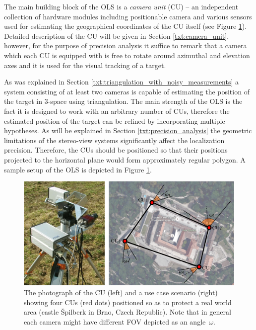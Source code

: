 The main building block of the OLS is a \textit{camera unit} (CU) -- an independent collection of hardware modules including positionable camera and various sensors used for estimating the geographical coordinates of the CU itself (see Figure \ref{fig:cu_and_topology}). Detailed description of the CU will be given in Section \ref{txt:camera_unit}, however, for the purpose of precision analysis it suffice to remark that a camera which each CU is equipped with is free to rotate around azimuthal and elevation axes and it is used for the visual tracking of a target.

As was explained in Section \ref{txt:triangulation_with_noisy_measurements} a system consisting of at least two cameras is capable of estimating the position of the target in 3-space using triangulation. The main strength of the OLS is the fact it is designed to work with an arbitrary number of CUs, therefore the estimated position of the target can be refined by incorporating multiple hypotheses. As will be explained in Section \ref{txt:precision_analysis} the geometric limitations of the stereo-view systems significantly affect the localization precision. Therefore, the CUs should be positioned so that their positions projected to the horizontal plane would form approximately regular polygon. A sample setup of the OLS is depicted in Figure \ref{fig:cu_and_topology}.

\begin{figure}[htb]\centering
	\centering
	\includegraphics[width=0.75\linewidth]{fig/cu_and_spilberk_camera_units.pdf}
	\caption{The photograph of the CU (left) and a use case scenario (right) showing four CUs (red dots) positioned so as to protect a real world area (castle Špilberk in Brno, Czech Republic). Note that in general each camera might have different FOV depicted as an angle~$\omega$.}
	\label{fig:cu_and_topology}
\end{figure}

~\\
~\\
